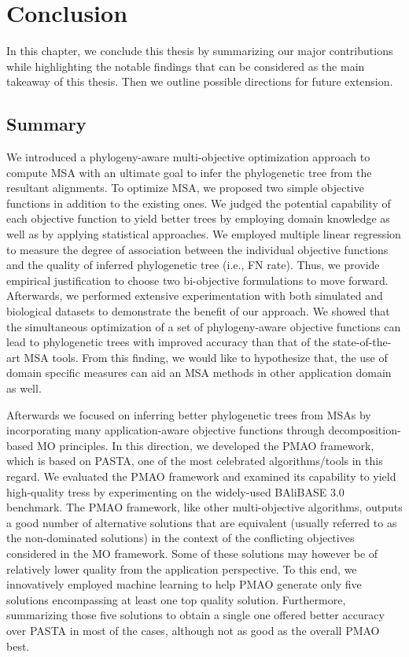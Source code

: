 \chapter{Conclusion}\label{ch:conclusion}

In this chapter, we conclude this thesis by summarizing our major contributions while highlighting the notable findings that can be considered as the main takeaway of this thesis. Then we outline possible directions for future extension.

\section{Summary}
We introduced a phylogeny-aware multi-objective optimization approach to compute MSA with an ultimate goal to infer the phylogenetic tree from the resultant alignments. To optimize MSA, we proposed two simple objective functions in addition to the existing ones. We judged the potential capability of each objective function to yield better trees by employing domain knowledge as well as by applying statistical approaches. We employed multiple linear regression to measure the degree of association between the individual objective functions and the quality of inferred phylogenetic tree (i.e., FN rate). Thus, we provide empirical justification to choose two bi-objective formulations to move forward. Afterwards, we performed extensive experimentation with both simulated and biological datasets to demonstrate the benefit of our approach. We showed that the simultaneous optimization of a set of phylogeny-aware objective functions can lead to phylogenetic trees with improved accuracy than that of the state-of-the-art MSA tools. From this finding, we would like to hypothesize that, the use of domain specific measures can aid an MSA methods in other application domain as well.

Afterwards we focused on inferring better phylogenetic trees from MSAs by incorporating many application-aware objective functions through decomposition-based MO principles. In this direction, we developed the PMAO framework, which is based on PASTA, one of the most celebrated algorithms/tools in this regard. We evaluated the PMAO framework and examined its capability to yield high-quality tress by experimenting on the widely-used BAliBASE 3.0 benchmark. The PMAO framework, like other multi-objective algorithms, outputs a good number of alternative solutions that are equivalent (usually referred to as the non-dominated solutions) in the context of the conflicting objectives considered in the MO framework. Some of these solutions may however be of relatively lower quality from the application perspective. To this end, we innovatively employed machine learning to help PMAO generate only five solutions encompassing at least one top quality solution. Furthermore, summarizing those five solutions to obtain a single one offered better accuracy over PASTA in most of the cases, although not as good as the overall PMAO best.

